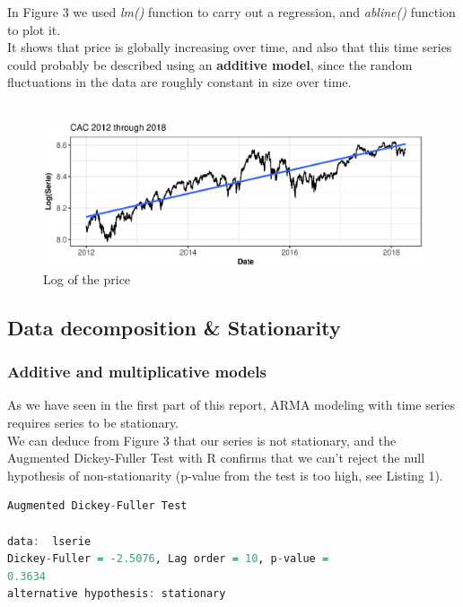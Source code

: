 In Figure 3 we used \textit{lm()} function to carry out a regression, and \textit{abline()} function to plot it. \\
It shows that price is globally increasing over time, and also that this time series could probably be described using an \textbf{additive model}, since the random fluctuations in the data are roughly constant in size over time. \\
\\
\FloatBarrier
\begin{figure}[!htbp]
  \centering
  \includegraphics[width=\textwidth]{img/Fig3.eps}
  \caption{Log of the price}
\end{figure}
\FloatBarrier

\subsection{Data decomposition \& Stationarity}

\subsubsection{Additive and multiplicative models}
As we have seen in the first part of this report, ARMA modeling with time series requires series to be stationary. \\
We can deduce from Figure 3 that our series is not stationary, and the Augmented Dickey-Fuller Test \cite{banerjee1993co,said1984testing} with R confirms that we can't reject the null hypothesis of non-stationarity (p-value from the test is too high, see Listing 1). \\

\begin{lstlisting}[language=R, caption=First test of stationarity]
	Augmented Dickey-Fuller Test

data:  lserie
Dickey-Fuller = -2.5076, Lag order = 10, p-value =
0.3634
alternative hypothesis: stationary
\end{lstlisting}

